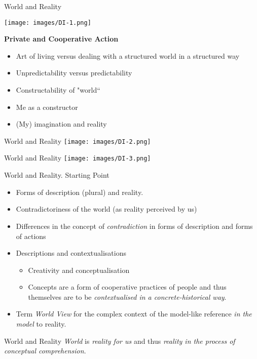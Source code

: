 \documentclass{beamer}
\newcommand{\ueberschrift}[1]{\begin{center}\bf #1\end{center}}
\begin{document}
\begin{frame}{World and Reality}

  \begin{minipage}{.4\textwidth}\centering
    \texttt{[image: images/DI-1.png]}
  \end{minipage}\hfill
  \begin{minipage}{.55\textwidth}
    \ueberschrift{Private and Cooperative Action}
    \begin{itemize}
    \item Art of living versus dealing with a structured world in a structured
      way
    \item Unpredictability versus predictability
    \item Constructability of "world“
    \item Me as a constructor
    \item (My) imagination and reality
    \end{itemize}
  \end{minipage}

\end{frame}
\begin{frame}{World and Reality}\centering
    \texttt{[image: images/DI-2.png]}
\end{frame}
\begin{frame}{World and Reality}\centering
    \texttt{[image: images/DI-3.png]}
\end{frame}
\begin{frame}{World and Reality. Starting Point}
  \begin{itemize}
  \item Forms of description (plural) and reality.
  \item Contradictoriness of the world (as reality perceived by us)
  \item Differences in the concept of \emph{contradiction} in forms of
    description and forms of actions
  \item Descriptions and contextualisations
    \begin{itemize}
    \item Creativity and conceptualisation
    \item Concepts are a form of cooperative practices of people and thus
      themselves are to be \emph{contextualised in a concrete-historical way}.
    \end{itemize}
  \item Term \emph{World View} for the complex context of the model-like
    reference \emph{in the model} to reality.
  \end{itemize}
  \begin{block}{World and Reality}
    \emph{World} is \emph{reality for us} and thus \emph{reality in the
      process of conceptual comprehension}.
  \end{block}
\end{frame}
\end{document}
